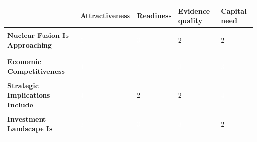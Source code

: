 \documentclass[10pt,a4paper]{article}
\begin{document}
{\scriptsize\begin{tabular}{p{38mm}>{\centering\arraybackslash}p{21mm}>{\centering\arraybackslash}p{21mm}>{\centering\arraybackslash}p{21mm}>{\centering\arraybackslash}p{21mm}}
 & {\bfseries Attractiveness} & {\bfseries Readiness} & {\bfseries Evidence quality} & {\bfseries Capital need} \\
\hline
{\bfseries Nuclear Fusion Is Approaching} & \colorbox{BOGreen}{\textcolor{white}{\strut\hspace{5pt}5\hspace{5pt}}} & \colorbox{BOBlue}{\textcolor{white}{\strut\hspace{5pt}3\hspace{5pt}}} & \colorbox{BOLight}{\textcolor{BOText}{\strut\hspace{5pt}2\hspace{5pt}}} & \colorbox{BOLight}{\textcolor{BOText}{\strut\hspace{5pt}2\hspace{5pt}}} \\
{\bfseries Economic Competitiveness} & \colorbox{BOGreen}{\textcolor{white}{\strut\hspace{5pt}4\hspace{5pt}}} & \colorbox{BOGreen}{\textcolor{white}{\strut\hspace{5pt}4\hspace{5pt}}} & \colorbox{BOBlue}{\textcolor{white}{\strut\hspace{5pt}3\hspace{5pt}}} & \colorbox{BOBlue}{\textcolor{white}{\strut\hspace{5pt}3\hspace{5pt}}} \\
{\bfseries Strategic Implications Include} & \colorbox{BOGreen}{\textcolor{white}{\strut\hspace{5pt}4\hspace{5pt}}} & \colorbox{BOLight}{\textcolor{BOText}{\strut\hspace{5pt}2\hspace{5pt}}} & \colorbox{BOLight}{\textcolor{BOText}{\strut\hspace{5pt}2\hspace{5pt}}} & \colorbox{BOGreen}{\textcolor{white}{\strut\hspace{5pt}4\hspace{5pt}}} \\
{\bfseries Investment Landscape Is} & \colorbox{BOBlue}{\textcolor{white}{\strut\hspace{5pt}3\hspace{5pt}}} & \colorbox{BOBlue}{\textcolor{white}{\strut\hspace{5pt}3\hspace{5pt}}} & \colorbox{BOBlue}{\textcolor{white}{\strut\hspace{5pt}3\hspace{5pt}}} & \colorbox{BOLight}{\textcolor{BOText}{\strut\hspace{5pt}2\hspace{5pt}}} \\

\end{tabular}}
\end{document}
